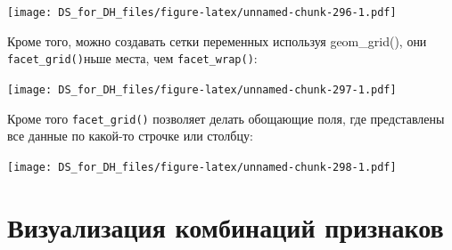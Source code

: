\documentclass[
]{book}
\newenvironment{Shaded}{\begin{snugshade}}{\end{snugshade}}
\newcommand{\DataTypeTok}[1]{\textcolor[rgb]{0.13,0.29,0.53}{#1}}
\newcommand{\FloatTok}[1]{\textcolor[rgb]{0.00,0.00,0.81}{#1}}
\newcommand{\KeywordTok}[1]{\textcolor[rgb]{0.13,0.29,0.53}{\textbf{#1}}}
\newcommand{\NormalTok}[1]{#1}
\newcommand{\OperatorTok}[1]{\textcolor[rgb]{0.81,0.36,0.00}{\textbf{#1}}}
\newcommand{\OtherTok}[1]{\textcolor[rgb]{0.56,0.35,0.01}{#1}}
\newcommand{\StringTok}[1]{\textcolor[rgb]{0.31,0.60,0.02}{#1}}
\begin{document}
\texttt{[image: DS\_for\_DH\_files/figure-latex/unnamed-chunk-296-1.pdf]}

Кроме того, можно создавать сетки переменных используя geom\_grid(), они \texttt{facet\_grid()}ньше места, чем \texttt{facet\_wrap()}:

\begin{Shaded}
\end{Shaded}

\texttt{[image: DS\_for\_DH\_files/figure-latex/unnamed-chunk-297-1.pdf]}

Кроме того \texttt{facet\_grid()} позволяет делать обощающие поля, где представлены все данные по какой-то строчке или столбцу:

\begin{Shaded}
\end{Shaded}

\texttt{[image: DS\_for\_DH\_files/figure-latex/unnamed-chunk-298-1.pdf]}

\hypertarget{ux432ux438ux437ux443ux430ux43bux438ux437ux430ux446ux438ux44f-ux43aux43eux43cux431ux438ux43dux430ux446ux438ux439-ux43fux440ux438ux437ux43dux430ux43aux43eux432}{%
\section{Визуализация комбинаций признаков}\label{ux432ux438ux437ux443ux430ux43bux438ux437ux430ux446ux438ux44f-ux43aux43eux43cux431ux438ux43dux430ux446ux438ux439-ux43fux440ux438ux437ux43dux430ux43aux43eux432}}
\end{document}
